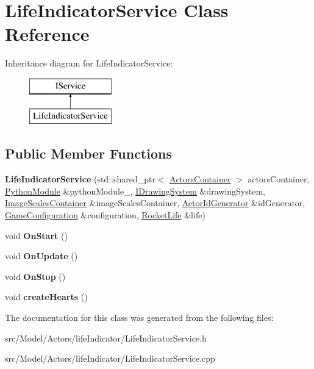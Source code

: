 \hypertarget{classLifeIndicatorService}{}\section{Life\+Indicator\+Service Class Reference}
\label{classLifeIndicatorService}
Inheritance diagram for Life\+Indicator\+Service\+:\begin{figure}[H]
\begin{center}
\leavevmode
\includegraphics[height=2.000000cm]{classLifeIndicatorService}
\end{center}
\end{figure}
\subsection*{Public Member Functions}
\begin{DoxyCompactItemize}
\item 
{\bfseries Life\+Indicator\+Service} (std\+::shared\+\_\+ptr$<$ \hyperlink{classActorsContainer}{Actors\+Container} $>$ actors\+Container, \hyperlink{classPythonModule}{Python\+Module} \&python\+Module\+\_\+, \hyperlink{classIDrawingSystem}{I\+Drawing\+System} \&drawing\+System, \hyperlink{classImageScalesContainer}{Image\+Scales\+Container} \&image\+Scales\+Container, \hyperlink{classActorIdGenerator}{Actor\+Id\+Generator} \&id\+Generator, \hyperlink{classGameConfiguration}{Game\+Configuration} \&configuration, \hyperlink{classRocketLife}{Rocket\+Life} \&life)\hypertarget{classLifeIndicatorService_a5b0001c984d01d2539714705075804f8}{}\label{classLifeIndicatorService_a5b0001c984d01d2539714705075804f8}

\item 
void {\bfseries On\+Start} ()\hypertarget{classLifeIndicatorService_aac1655745946c2ccd17604a67eabc233}{}\label{classLifeIndicatorService_aac1655745946c2ccd17604a67eabc233}

\item 
void {\bfseries On\+Update} ()\hypertarget{classLifeIndicatorService_a14dec199902432acc7c91771a4ff0660}{}\label{classLifeIndicatorService_a14dec199902432acc7c91771a4ff0660}

\item 
void {\bfseries On\+Stop} ()\hypertarget{classLifeIndicatorService_a983dd9b340e72a600ae69f835ff25254}{}\label{classLifeIndicatorService_a983dd9b340e72a600ae69f835ff25254}

\item 
void {\bfseries create\+Hearts} ()\hypertarget{classLifeIndicatorService_a35973975f2c9b826be06a4170e803869}{}\label{classLifeIndicatorService_a35973975f2c9b826be06a4170e803869}

\end{DoxyCompactItemize}


The documentation for this class was generated from the following files\+:\begin{DoxyCompactItemize}
\item 
src/\+Model/\+Actors/life\+Indicator/Life\+Indicator\+Service.\+h\item 
src/\+Model/\+Actors/life\+Indicator/Life\+Indicator\+Service.\+cpp\end{DoxyCompactItemize}

